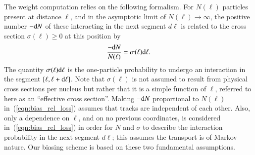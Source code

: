 The weight computation relies on the following formalism.  For $N(\ell)$ 
particles present at distance $\ell$, and in the asymptotic limit of 
$N(\ell)\to \infty$, the positive number $-{\rm d}N$ of these interacting
in the next segment ${d}\ell$ is related to the cross section 
$\sigma(\ell) \ge 0$ at this position by
\begin{equation}
\label{eqn:bias_rel_loss}
\frac{-{\rm d}N}{N(\ell)}=\sigma(\ell) {{\rm d}\ell}.
\end{equation}
The quantity $\sigma(\ell) {{\rm d}\ell}$ is the one-particle probability to 
undergo an interaction in the segment $[\ell, \ell+{\rm d}\ell]$.  Note that
$\sigma(\ell)$ is not assumed to result from physical cross sections per nucleus
but rather that it is a simple function of $\ell$, referred to here as an
``effective cross section''.  Making $-{\rm d}N$ proportional to $N(\ell)$
in~(\ref{eqn:bias_rel_loss}) assumes that tracks are independent of each other.
Also, only a dependence on $\ell$, and on no previous coordinates, is considered
in~(\ref{eqn:bias_rel_loss}) in order for $N$ and $\sigma$ to describe the 
interaction probability in the next segment ${d}\ell$; this assumes the 
transport is of Markov nature.  Our biasing scheme is based on these two 
fundamental assumptions.




